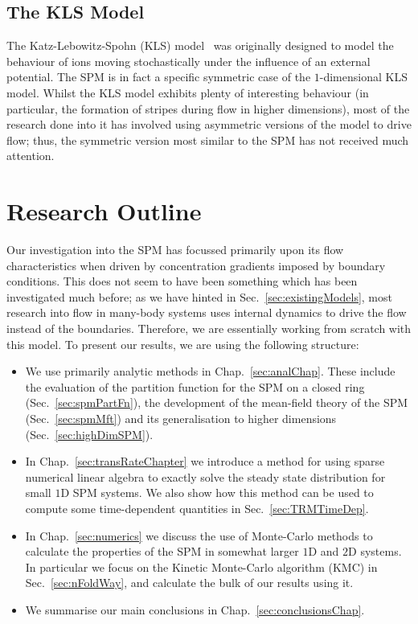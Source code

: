 \subsection{The KLS Model}
The Katz-Lebowitz-Spohn (KLS) model~\cite{Katz1984, Zia2010} was originally designed to model the
behaviour of ions moving stochastically
under the influence of an external potential. The SPM is in fact a specific symmetric case of the
$1$-dimensional KLS model. Whilst the KLS model exhibits plenty of interesting behaviour
(in particular, the formation of stripes during flow in higher dimensions), most of the research done
into it has involved using asymmetric versions of the model to drive flow; thus, the symmetric version
most similar to the SPM has not received much attention.

\section{Research Outline}
Our investigation into the SPM has focussed primarily upon its flow characteristics when driven
by concentration gradients imposed by boundary conditions. This does not seem to have been something
which has been investigated much before; as we have hinted in Sec.~\ref{sec:existingModels}, most
research into flow in many-body systems uses internal dynamics to drive the flow instead of the 
boundaries. Therefore, we are essentially working from scratch with this model.
To present our results, we are using the following structure:
\begin{itemize}
 \item We use primarily analytic methods in Chap.~\ref{sec:analChap}. These include the evaluation
 of the partition function for the SPM on a closed ring (Sec.~\ref{sec:spmPartFn}), the development
 of the mean-field theory of the SPM (Sec.~\ref{sec:spmMft}) and its generalisation to higher dimensions
 (Sec.~\ref{sec:highDimSPM}).
 \item In Chap.~\ref{sec:transRateChapter} we introduce a method for using sparse numerical linear
 algebra to exactly solve the steady state distribution for small $1$D SPM systems. We also show how this
 method can be used to compute some time-dependent quantities in Sec.~\ref{sec:TRMTimeDep}.
 \item In Chap.~\ref{sec:numerics} we discuss the use of Monte-Carlo methods to calculate the properties
 of the SPM in somewhat larger $1$D and $2$D systems. In particular we focus on the Kinetic
  Monte-Carlo algorithm (KMC) in Sec.~\ref{sec:nFoldWay}, and calculate the bulk of our results
  using it.
\item We summarise our main conclusions in Chap.~\ref{sec:conclusionsChap}.
\end{itemize}


